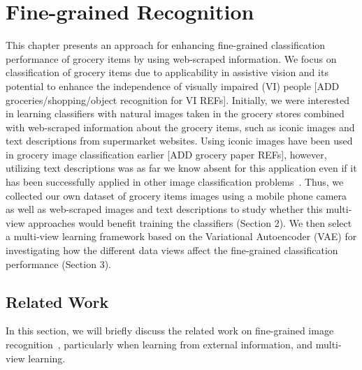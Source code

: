 
\chapter{Fine-grained Recognition}
\label{chap:finegrained_classification}


This chapter presents an approach for enhancing fine-grained classification performance of grocery items by using web-scraped information. We focus on classification of grocery items due to applicability in assistive vision and its potential to enhance the independence of visually impaired (VI) people [ADD groceries/shopping/object recognition for VI REFs]. Initially, we were interested in learning classifiers with natural images taken in the grocery stores combined with web-scraped information about the grocery items, such as iconic images and text descriptions from supermarket websites. Using iconic images have been used in grocery image classification earlier [ADD grocery paper REFs], however, utilizing text descriptions was as far we know absent for this application even if it has been successfully applied in other image classification problems~\cite{wah2011cub, nilsback2008automated, bujwid2021large}. Thus, we collected our own dataset of grocery items images using a mobile phone camera as well as web-scraped images and text descriptions to study whether this multi-view approaches would benefit training the classifiers (Section 2). We then select a multi-view learning framework based on the Variational Autoencoder (VAE) for investigating how the different data views affect the fine-grained classification performance (Section 3). 

\section{Related Work}

In this section, we will briefly discuss the related work on fine-grained image recognition~\cite{wei2021fine}, particularly when learning from external information, and multi-view learning. 


